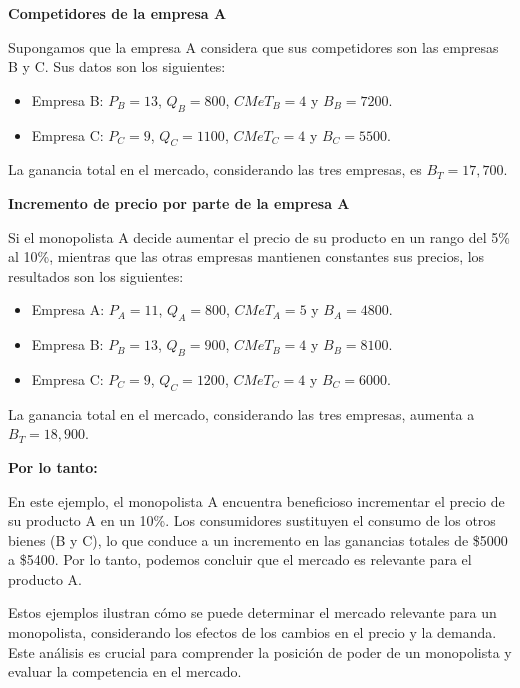 \documentclass[
  a4paper,
]{article}
\providecommand{\tightlist}{%
  \setlength{\itemsep}{0pt}\setlength{\parskip}{0pt}}\usepackage{longtable,booktabs,array}
\theoremstyle{definition}
\theoremstyle{remark}
\begin{document}
\textbf{Competidores de la empresa A}

Supongamos que la empresa A considera que sus competidores son las
empresas B y C. Sus datos son los siguientes:

\begin{itemize}
\tightlist
\item
  Empresa B: \(P_B = 13\), \(Q_B = 800\), \(CMeT_B = 4\) y
  \(B_B = 7200\).
\item
  Empresa C: \(P_C = 9\), \(Q_C = 1100\), \(CMeT_C = 4\) y
  \(B_C = 5500\).
\end{itemize}

La ganancia total en el mercado, considerando las tres empresas, es
\(B_T = 17,700\).

\textbf{Incremento de precio por parte de la empresa A}

Si el monopolista A decide aumentar el precio de su producto en un rango
del 5\% al 10\%, mientras que las otras empresas mantienen constantes
sus precios, los resultados son los siguientes:

\begin{itemize}
\tightlist
\item
  Empresa A: \(P_A = 11\), \(Q_A = 800\), \(CMeT_A = 5\) y
  \(B_A = 4800\).
\item
  Empresa B: \(P_B = 13\), \(Q_B = 900\), \(CMeT_B = 4\) y
  \(B_B = 8100\).
\item
  Empresa C: \(P_C = 9\), \(Q_C = 1200\), \(CMeT_C = 4\) y
  \(B_C = 6000\).
\end{itemize}

La ganancia total en el mercado, considerando las tres empresas, aumenta
a \(B_T = 18,900\).

\textbf{Por lo tanto:}

En este ejemplo, el monopolista A encuentra beneficioso incrementar el
precio de su producto A en un 10\%. Los consumidores sustituyen el
consumo de los otros bienes (B y C), lo que conduce a un incremento en
las ganancias totales de \$5000 a \$5400. Por lo tanto, podemos concluir
que el mercado es relevante para el producto A.

Estos ejemplos ilustran cómo se puede determinar el mercado relevante
para un monopolista, considerando los efectos de los cambios en el
precio y la demanda. Este análisis es crucial para comprender la
posición de poder de un monopolista y evaluar la competencia en el
mercado.
\end{document}
